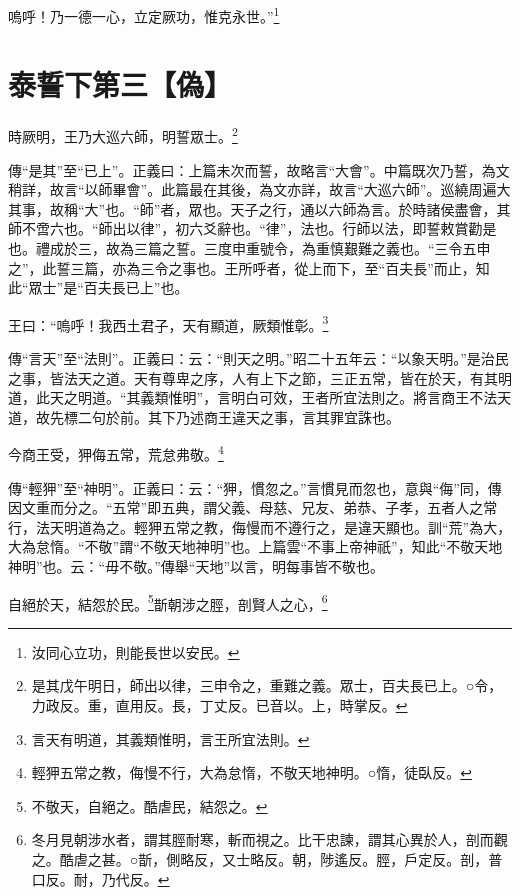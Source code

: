 嗚呼！乃一德一心，立定厥功，惟克永世。”\footnote{汝同心立功，則能長世以安民。}

\section{泰誓下第三【偽】}


時厥明，王乃大巡六師，明誓眾士。\footnote{是其戊午明日，師出以律，三申令之，重難之義。眾士，百夫長已上。○令，力政反。重，直用反。長，丁丈反。已音以。上，時掌反。}

{\noindent\zhuan{}\fzbyks 傳“是其”至“已上”。正義曰：上篇未次而誓，故略言“大會”。中篇既次乃誓，為文稍詳，故言“以師畢會”。此篇最在其後，為文亦詳，故言“大巡六師”。巡繞周遍大其事，故稱“大”也。“師”者，眾也。天子之行，通以六師為言。於時諸侯盡會，其師不啻六也。“師出以律”，初六爻辭也。“律”，法也。行師以法，即誓敕賞勸是也。禮成於三，故為三篇之誓。三度申重號令，為重慎艱難之義也。“三令五申之”，此誓三篇，亦為三令之事也。王所呼者，從上而下，至“百夫長”而止，知此“眾士”是“百夫長已上”也。 \par}

王曰：“嗚呼！我西土君子，天有顯道，厥類惟彰。\footnote{言天有明道，其義類惟明，言王所宜法則。}

{\noindent\zhuan{}\fzbyks 傳“言天”至“法則”。正義曰：云：“則天之明。”昭二十五年云：“以象天明。”是治民之事，皆法天之道。天有尊卑之序，人有上下之節，三正五常，皆在於天，有其明道，此天之明道。“其義類惟明”，言明白可效，王者所宜法則之。將言商王不法天道，故先標二句於前。其下乃述商王違天之事，言其罪宜誅也。 \par}

今商王受，狎侮五常，荒怠弗敬。\footnote{輕狎五常之教，侮慢不行，大為怠惰，不敬天地神明。○惰，徒臥反。}

{\noindent\zhuan{}\fzbyks 傳“輕狎”至“神明”。正義曰：云：“狎，慣忽之。”言慣見而忽也，意與“侮”同，傳因文重而分之。“五常”即五典，謂父義、母慈、兄友、弟恭、子孝，五者人之常行，法天明道為之。輕狎五常之教，侮慢而不遵行之，是違天顯也。訓“荒”為大，大為怠惰。“不敬”謂“不敬天地神明”也。上篇雲“不事上帝神祇”，知此“不敬天地神明”也。云：“毋不敬。”傳舉“天地”以言，明每事皆不敬也。 \par}

自絕於天，結怨於民。\footnote{不敬天，自絕之。酷虐民，結怨之。}斮朝涉之脛，剖賢人之心，\footnote{冬月見朝涉水者，謂其脛耐寒，斬而視之。比干忠諫，謂其心異於人，剖而觀之。酷虐之甚。○斮，側略反，又士略反。朝，陟遙反。脛，戶定反。剖，普口反。耐，乃代反。}

